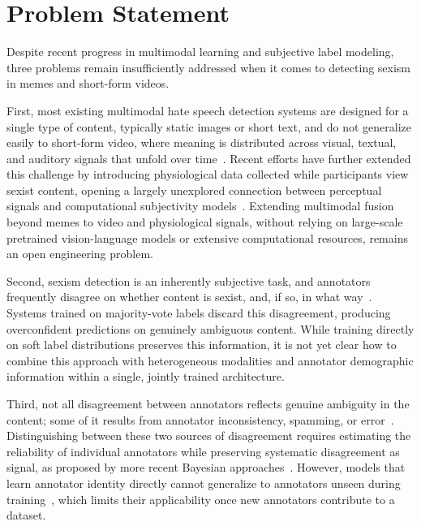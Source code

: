 \section{Problem Statement}\label{sec:problem-statement}

Despite recent progress in multimodal learning and subjective label modeling, three
problems remain insufficiently addressed when it comes to detecting sexism in memes and
short-form videos.

First, most existing multimodal hate speech detection systems are designed for a single
type of content, typically static images or short text, and do not generalize easily to
short-form video, where meaning is distributed across visual, textual, and auditory signals
that unfold over time~\cite{tong2022videomae}. Recent efforts have further extended this
challenge by introducing physiological data collected while participants view sexist content,
opening a largely unexplored connection between perceptual signals and computational
subjectivity models~\cite{exist2026overview}. Extending multimodal fusion beyond memes
to video and physiological signals, without relying on large-scale pretrained vision-language
models or extensive computational resources, remains an open engineering problem.

Second, sexism detection is an inherently subjective task, and annotators frequently
disagree on whether content is sexist, and, if so, in what way~\cite{uma2021learning,
plank2022problem}. Systems trained on majority-vote labels discard this disagreement,
producing overconfident predictions on genuinely ambiguous content. While training
directly on soft label distributions preserves this information, it is not yet clear how to
combine this approach with heterogeneous modalities and annotator demographic information within a single, jointly trained architecture.

Third, not all disagreement between annotators reflects genuine ambiguity in the content;
some of it results from annotator inconsistency, spamming, or error~\cite{hovy2013mace,
dawid1979maximum}. Distinguishing between these two sources of disagreement requires
estimating the reliability of individual annotators while preserving systematic disagreement as signal, as proposed by more recent Bayesian approaches~\cite{ivey2025nutmeg}.
However, models that learn annotator identity directly cannot generalize to annotators
unseen during training~\cite{davani2022dealing}, which limits their applicability once new
annotators contribute to a dataset.

